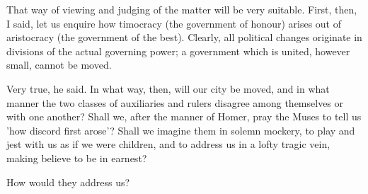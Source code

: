 That way of viewing and judging of the matter will be very suitable.
First, then, I said, let us enquire how timocracy (the government of honour) arises out of aristocracy (the government of the best). Clearly, all political changes originate in divisions of the actual governing power; a government which is united, however small, cannot be moved.

Very true, he said.
In what way, then, will our city be moved, and in what manner the two classes of auxiliaries and rulers disagree among themselves or with one another? Shall we, after the manner of Homer, pray the Muses to tell us 'how discord first arose'? Shall we imagine them in solemn mockery, to play and jest with us as if we were children, and to address us in a lofty tragic vein, making believe to be in earnest?

How would they address us?

